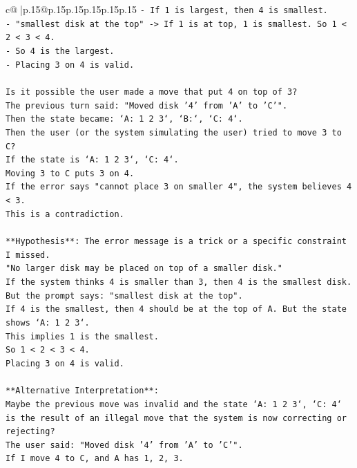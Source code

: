 \documentclass{article}
\begin{document}
{\begin{supertabular}{c@{$\;$}|p{.15\linewidth}@{}p{.15\linewidth}p{.15\linewidth}p{.15\linewidth}p{.15\linewidth}p{.15\linewidth}}
{{{\texttt{{-} If 1 is largest, then 4 is smallest.} \\
\texttt{{-} "smallest disk at the top" {-}> If 1 is at top, 1 is smallest. So 1 < 2 < 3 < 4.} \\
\texttt{{-} So 4 is the largest.} \\
\texttt{{-} Placing 3 on 4 is valid.} \\
\\ 
\texttt{Is it possible the user made a move that put 4 on top of 3?} \\
\texttt{The previous turn said: "Moved disk '4' from 'A' to 'C'".} \\
\texttt{Then the state became: `A: 1 2 3`, `B:`, `C: 4`.} \\
\texttt{Then the user (or the system simulating the user) tried to move 3 to C?} \\
\texttt{If the state is `A: 1 2 3`, `C: 4`.} \\
\texttt{Moving 3 to C puts 3 on 4.} \\
\texttt{If the error says "cannot place 3 on smaller 4", the system believes 4 < 3.} \\
\texttt{This is a contradiction.} \\
\\ 
\texttt{**Hypothesis**: The error message is a trick or a specific constraint I missed.} \\
\texttt{"No larger disk may be placed on top of a smaller disk."} \\
\texttt{If the system thinks 4 is smaller than 3, then 4 is the smallest disk.} \\
\texttt{But the prompt says: "smallest disk at the top".} \\
\texttt{If 4 is the smallest, then 4 should be at the top of A. But the state shows `A: 1 2 3`.} \\
\texttt{This implies 1 is the smallest.} \\
\texttt{So 1 < 2 < 3 < 4.} \\
\texttt{Placing 3 on 4 is valid.} \\
\\ 
\texttt{**Alternative Interpretation**:} \\
\texttt{Maybe the previous move was invalid and the state `A: 1 2 3`, `C: 4` is the result of an illegal move that the system is now correcting or rejecting?} \\
\texttt{The user said: "Moved disk '4' from 'A' to 'C'".} \\
\texttt{If I move 4 to C, and A has 1, 2, 3.} \\
}}}
\end{supertabular}}
\end{document}

